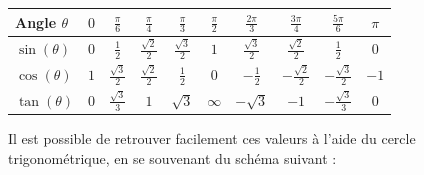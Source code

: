 \documentclass[a4paper]{article}
\begin{document}
				\begin{center}
					\renewcommand{\arraystretch}{1.75}
					\begin{tabular}{|l||c||c|c|c||c||c|c|c||c|}
						\hline
						Angle $\theta$ & $0$ & {\large $\frac{\pi}{6}$} & {\large $\frac{\pi}{4}$} & {\large $\frac{\pi}{3}$} & {\large $\frac{\pi}{2}$} & {\large $\frac{2\pi}{3}$} & {\large $\frac{3\pi}{4}$} & {\large $\frac{5\pi}{6}$} & $\pi$\\
						\hline
						\hline
						$\sin(\theta)$ & $0$ & {\large $\frac{1}{2}$} & {\large $\frac{\sqrt{2}}{2}$} & {\large $\frac{\sqrt{3}}{2}$} & $1$ & {\large $\frac{\sqrt{3}}{2}$} & {\large $\frac{\sqrt{2}}{2}$} & {\large $\frac{1}{2}$} & $0$ \\
						\hline
						$\cos(\theta)$ & $1$ & {\large $\frac{\sqrt{3}}{2}$} & {\large $\frac{\sqrt{2}}{2}$} & {\large $\frac{1}{2}$} & $0$ & {\large $-\frac{1}{2}$} & {\large $-\frac{\sqrt{2}}{2}$} & {\large $-\frac{\sqrt{3}}{2}$} & $-1$ \\
						\hline
						$\tan(\theta)$ & $0$ & {\large $\frac{\sqrt{3}}{3}$} & $1$ & $\sqrt{3}$ & $\infty$ & $-\sqrt{3}$ & $-1$ & $-\frac{\sqrt{3}}{3}$ & $0$ \\
						\hline
					\end{tabular}
				\end{center}

			Il est possible de retrouver facilement ces valeurs 
			à l'aide du cercle trigonométrique, en se souvenant du
			schéma suivant :
			
\end{document}
